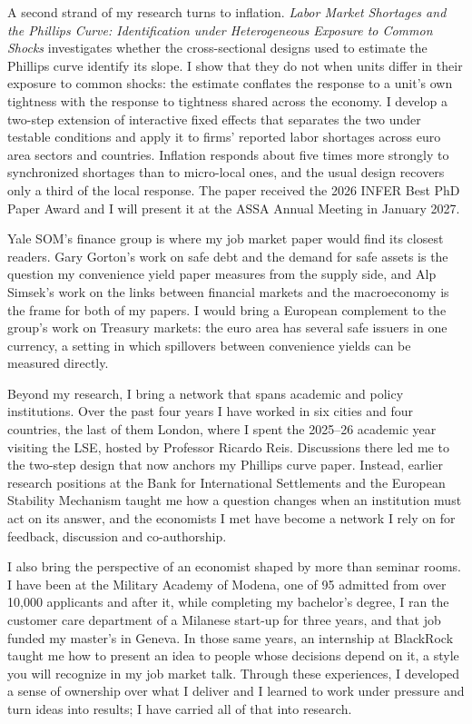 \documentclass[11pt]{article}
\begin{document}
A second strand of my research turns to inflation. \textit{Labor Market Shortages and the Phillips Curve: Identification under Heterogeneous Exposure to Common Shocks} investigates whether the cross-sectional designs used to estimate the Phillips curve identify its slope. I show that they do not when units differ in their exposure to common shocks: the estimate conflates the response to a unit's own tightness with the response to tightness shared across the economy. I develop a two-step extension of interactive fixed effects that separates the two under testable conditions and apply it to firms' reported labor shortages across euro area sectors and countries. Inflation responds about five times more strongly to synchronized shortages than to micro-local ones, and the usual design recovers only a third of the local response. The paper received the 2026 INFER Best PhD Paper Award and I will present it at the ASSA Annual Meeting in January 2027.

Yale SOM's finance group is where my job market paper would find its closest readers. Gary Gorton's work on safe debt and the demand for safe assets is the question my convenience yield paper measures from the supply side, and Alp Simsek's work on the links between financial markets and the macroeconomy is the frame for both of my papers. I would bring a European complement to the group's work on Treasury markets: the euro area has several safe issuers in one currency, a setting in which spillovers between convenience yields can be measured directly.

Beyond my research, I bring a network that spans academic and policy institutions. Over the past four years I have worked in six cities and four countries, the last of them London, where I spent the 2025--26 academic year visiting the LSE, hosted by Professor Ricardo Reis. Discussions there led me to the two-step design that now anchors my Phillips curve paper. Instead, earlier research positions at the Bank for International Settlements and the European Stability Mechanism taught me how a question changes when an institution must act on its answer, and the economists I met have become a network I rely on for feedback, discussion and co-authorship.

I also bring the perspective of an economist shaped by more than seminar rooms. I have been at the Military Academy of Modena, one of 95 admitted from over 10,000 applicants and after it, while completing my bachelor's degree, I ran the customer care department of a Milanese start-up for three years, and that job funded my master's in Geneva. In those same years, an internship at BlackRock taught me how to present an idea to people whose decisions depend on it, a style you will recognize in my job market talk. Through these experiences, I developed a sense of ownership over what I deliver and I learned to work under pressure and turn ideas into results; I have carried all of that into research. %
\end{document}
